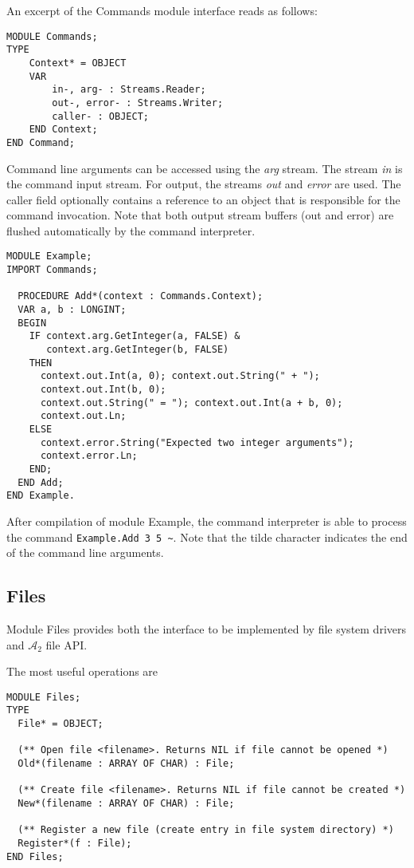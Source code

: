 \documentclass[a4paper,11pt]{article}
\newcommand{\AZ}{\ensuremath{\mathcal{A}_{2}}\xspace}
\begin{document}
An excerpt of the Commands module interface reads as follows:
\begin{lstlisting}[language=Oberon,frame=none,caption={Command Context}]
MODULE Commands;
TYPE
    Context* = OBJECT
    VAR
        in-, arg- : Streams.Reader;
        out-, error- : Streams.Writer;
        caller- : OBJECT;
    END Context;
END Command;
\end{lstlisting}

Command line arguments can be accessed using the \emph{arg} stream. The stream \emph{in} is the command input stream. For output, the streams \emph{out} and \emph{error} are used.
The caller field optionally contains a reference to an object that is responsible for the command invocation. Note that both output stream buffers (out and error) are flushed automatically by the command interpreter.

\begin{lstlisting}[language=Oberon,frame=none,caption={Command Example}]
MODULE Example;
IMPORT Commands;

  PROCEDURE Add*(context : Commands.Context);
  VAR a, b : LONGINT;
  BEGIN
    IF context.arg.GetInteger(a, FALSE) &
       context.arg.GetInteger(b, FALSE)
    THEN
      context.out.Int(a, 0); context.out.String(" + ");
      context.out.Int(b, 0);
      context.out.String(" = "); context.out.Int(a + b, 0);
      context.out.Ln;
    ELSE
      context.error.String("Expected two integer arguments");
      context.error.Ln;
    END;
  END Add;
END Example.
\end{lstlisting}

After compilation of module Example, the command interpreter is able to process the command
\verb+Example.Add 3 5 ~+.
Note that the tilde character indicates the end of the command line arguments.

\subsection{Files}
Module Files provides both the interface to be implemented by file system drivers and \AZ file API.

The most useful operations are
\begin{lstlisting}[language=Oberon,frame=none,caption={Basic Files API}]
MODULE Files;
TYPE
  File* = OBJECT;

  (** Open file <filename>. Returns NIL if file cannot be opened *)
  Old*(filename : ARRAY OF CHAR) : File;

  (** Create file <filename>. Returns NIL if file cannot be created *)
  New*(filename : ARRAY OF CHAR) : File;

  (** Register a new file (create entry in file system directory) *)
  Register*(f : File);
END Files;
\end{lstlisting}
\end{document}
